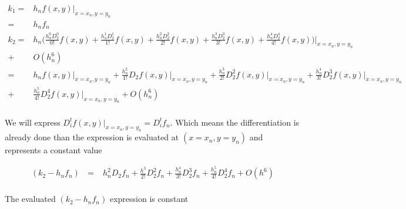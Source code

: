 \documentclass[12 pt]{article}
\begin{document}
{
\normalsize
\begin{align*}
k_{1} =& h_{n}f(x,y)\big\vert_{x = x_{n}, y= y_{n}}\\ 
	  =& h_{n}f_{n} \\
k_{2} =& h_{n}\bigg(\frac{h_{n}^{0}D_{2}^{0}}{0!}f(x,y) + \frac{h_{n}^{1}D_{2}^{1}}{1!}f(x,y) + \frac{h_{n}^{2}D_{2}^{2}}{2!}f(x,y) + \frac{h_{n}^{3}D_{2}^{3}}{3!}f(x,y) + \frac{h_{n}^{4}D_{2}^{4}}{4!}f(x,y)\bigg)\bigg\vert_{x = x_{n}, y= y_{n}}\\ 
	  +& O(h_{n}^{6})\\
	  =& h_{n}f(x,y)\big\vert_{x = x_{n}, y= y_{n}} + \frac{h_{n}^{2}}{1!}D_{2}f(x,y)\big\vert_{x = x_{n}, y= y_{n}} + \frac{h_{n}^{3}}{2!}D_{2}^{2}f(x,y)\big\vert_{x = x_{n}, y= y_{n}} + \frac{h_{n}^{4}}{3!}D_{2}^{3}f(x,y)\big\vert_{x = x_{n}, y= y_{n}}\\ 
	  +& \frac{h_{n}^{5}}{4!}D_{2}^{4}f(x,y)\big\vert_{x = x_{n}, y= y_{n}} + O(h_{n}^{6})\\
\end{align*}
}

We will express  $D_{i}^{t}f(x,y)\big\vert_{x = x_{n}, y= y_{n}} = D_{i}^{t}f_{n}$. Which means the differentiation is already done than the expression is evaluated at $(x= x_{n}, y=y_{n})$ and represents a constant value

{
\large
\begin{align*}
(k_{2}-h_{n}f_{n}) \text{ }=&  h_{n}^{2}D_{2}f_{n} + \frac{h^{3}}{2!}D_{2}^{2}f_{n} + \frac{h_{n}^{4}}{3!}D_{2}^{3}f_{n} + \frac{h_{n}^{5}}{4!}D_{2}^{4}f_{n} + O(h^{6})\\
\end{align*}
}

The evaluated $(k_{2} - h_{n}f_{n})$ expression is constant
\end{document}

